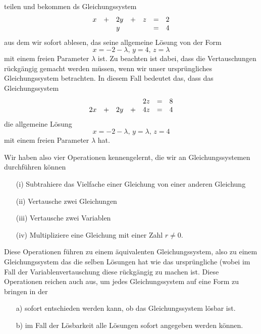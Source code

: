 \begin{beispiel}
teilen und bekommen ds Gleichungssystem
  	$$ \begin{array} {l c l c l c l}
    	x & + & 2y & + & z & = & 2 \\
    	&  & y & & & = & 4 \\
   	\end{array} $$
aus dem wir sofort ablesen, das seine allgemeine Lösung von der Form 
  	$$ x = -2 - \lambda, \, y = 4, \, z = \lambda $$
mit einem freien Parameter $\lambda$ ist. Zu beachten ist dabei, dass die Vertauschungen rückgängig gemacht 
werden müssen, wenn wir unser ursprüngliches Gleichungssystem betrachten. In diesem Fall bedeutet das, dass
das Gleichungssystem 
  	$$ \begin{array} {l c l c l c l}
    	&  &  & & 2 z & = & 8 \\
   	2 x & + & 2 y & + & 4 z & = & 4 
   	\end{array} $$
die allgemeine Lösung
 	$$ x = -2 - \lambda, \, y = \lambda,  \, z = 4 $$
mit einem freien Parameter $\lambda$ hat.
\end{beispiel}

\begin{notiz}\label{gls_equ_operation}
Wir haben also vier Operationen kennengelernt, die wir an Gleichungssystemen durchführen können

\begin{itemize}
\item[(i)] Subtrahiere das Vielfache einer Gleichung von einer anderen Gleichung
\item[(ii)] Vertausche zwei Gleichungen 
\item[(iii)] Vertausche zwei Variablen
\item[(iv)] Multipliziere eine Gleichung mit einer Zahl $r \neq 0$.
\end{itemize}

Diese Operationen führen zu einem äquivalenten Gleichungssystem, also zu einem Gleichungssystem das die 
selben Lösungen hat wie das ursprüngliche (wobei im Fall der Variablenvertauschung diese rückgängig 
zu machen ist. Diese Operationen reichen auch aus, um jedes Gleichungssystem auf eine Form zu bringen in der 

\begin{itemize}
\item[a)] sofort entschieden werden kann, ob das Gleichungssystem lösbar ist.
\item[b)] im Fall der Lösbarkeit alle Lösungen sofort angegeben werden können.
\end{itemize}
\end{notiz}

